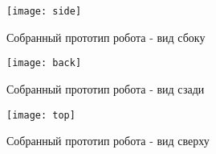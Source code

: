 \begin{figure}[h!]
	\begin{center}
		\texttt{[image: side]}
		\caption{Собранный прототип робота - вид сбоку}
		\label{side}
	\end{center}
\end{figure}

\begin{figure}[h!]
	\begin{center}
		\texttt{[image: back]}
		\caption{Собранный прототип робота - вид сзади}
		\label{back}
	\end{center}
\end{figure}
\newpage
\begin{figure}[h!]
	\begin{center}
		\texttt{[image: top]}
		\caption{Собранный прототип робота - вид сверху}
		\label{top}
	\end{center}
\end{figure}